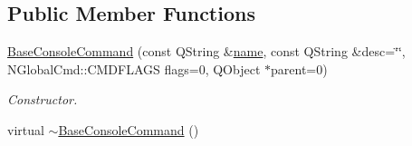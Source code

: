 \subsection*{Public Member Functions}
\begin{DoxyCompactItemize}
\item 
\hyperlink{class_base_console_command_af36ba741b2ed473a9fa65921639736d5}{Base\-Console\-Command} (const Q\-String \&\hyperlink{class_base_console_command_a2f21764f46a3864a362eae2e3396e363}{name}, const Q\-String \&desc=\char`\"{}\char`\"{}, N\-Global\-Cmd\-::\-C\-M\-D\-F\-L\-A\-G\-S flags=0, Q\-Object $\ast$parent=0)
\begin{DoxyCompactList}\small\item\em Constructor. \end{DoxyCompactList}\item 
\hypertarget{class_base_console_command_a7d1ca8afdd3549778540595fd9f33881}{virtual \hyperlink{class_base_console_command_a7d1ca8afdd3549778540595fd9f33881}{$\sim$\-Base\-Console\-Command} ()}\label{class_base_console_command_a7d1ca8afdd3549778540595fd9f33881}


\end{DoxyCompactItemize}

